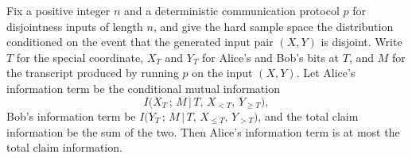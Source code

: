 \begin{theorem}
\label{CommunicationComplexity.Functions.Disjointness.RandomizedLowerBound.aliceInfoTerm_le_claimInfo}
\leanok
{}
Fix a positive integer $n$ and a deterministic communication protocol $p$ for
disjointness inputs of length $n$, and give the hard sample space the distribution
conditioned on the event that the generated input pair $(X,Y)$ is disjoint. Write $T$
for the special coordinate, $X_T$ and $Y_T$ for Alice's and Bob's bits at $T$, and $M$
for the transcript produced by running $p$ on the input $(X,Y)$. Let Alice's information
term be the conditional mutual information
\[
I\bigl(X_T \,;\, M \,\big|\, T,\, X_{<T},\, Y_{\ge T}\bigr),
\]
Bob's information term be $I\bigl(Y_T \,;\, M \,\big|\, T,\, X_{\le T},\, Y_{>T}\bigr)$,
and the total claim information be the sum of the two. Then Alice's information term is
at most the total claim information.
\end{theorem}

